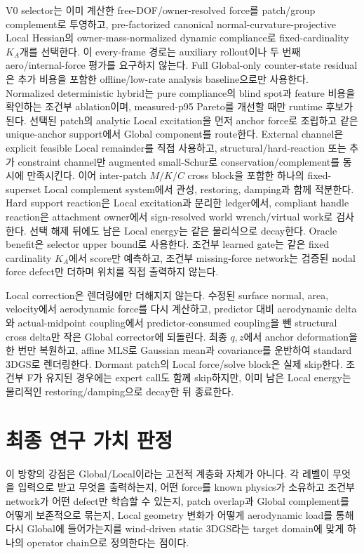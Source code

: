 \documentclass[11pt,a4paper]{article}
\begin{document}
V0 selector는 이미 계산한 free-DOF/owner-resolved force를 patch/group complement로 투영하고,
pre-factorized canonical normal-curvature-projective Local Hessian의 owner-mass-normalized dynamic compliance로
fixed-cardinality \(K_A\)개를 선택한다. 이 every-frame 경로는 auxiliary rollout이나 두 번째
aero/internal-force 평가를 요구하지 않는다. Full Global-only counter-state residual은
추가 비용을 포함한 offline/low-rate analysis baseline으로만 사용한다.
Normalized deterministic hybrid는 pure compliance의 blind spot과 feature 비용을 확인하는
조건부 ablation이며, measured-p95 Pareto를 개선할 때만 runtime 후보가 된다.
선택된 patch의 analytic Local excitation을 먼저 anchor force로 조립하고
같은 unique-anchor support에서 Global component를 route한다. External channel은 explicit
feasible Local remainder를 직접 사용하고, structural/hard-reaction 또는 추가 constraint channel만
augmented small-Schur로 conservation/complement를 동시에 만족시킨다. 이어 inter-patch
\(M/K/C\) cross block을 포함한 하나의 fixed-superset
Local complement system에서 관성, restoring, damping과 함께 적분한다.
Hard support reaction은 Local excitation과 분리한 ledger에서, compliant handle reaction은
attachment owner에서 sign-resolved world wrench/virtual work로 검사한다.
선택 해제 뒤에도 남은 Local energy는 같은 물리식으로 decay한다.
Oracle benefit은 selector upper bound로 사용한다.
조건부 learned gate는 같은 fixed cardinality \(K_A\)에서 score만 예측하고,
조건부 missing-force network는 검증된 nodal force defect만 더하며 위치를 직접 출력하지 않는다.

Local correction은 렌더링에만 더해지지 않는다.
수정된 surface normal, area, velocity에서 aerodynamic force를 다시 계산하고,
predictor 대비 aerodynamic delta와
actual-midpoint coupling에서 predictor-consumed coupling을 뺀 structural cross delta만
작은 Global corrector에 되돌린다.
최종 \(q,z\)에서 anchor deformation을 한 번만 복원하고,
affine MLS로 Gaussian mean과 covariance를 운반하여 standard 3DGS로 렌더링한다.
Dormant patch의 Local force/solve block은 실제 skip한다.
조건부 F가 유지된 경우에는 expert call도 함께 skip하지만,
이미 남은 Local energy는 물리적인 restoring/damping으로 decay한 뒤 종료한다.

\section{최종 연구 가치 판정}

이 방향의 강점은 Global/Local이라는 고전적 계층화 자체가 아니다.
각 레벨이 무엇을 입력으로 받고 무엇을 출력하는지,
어떤 force를 known physics가 소유하고 조건부 network가 어떤 defect만 학습할 수 있는지,
patch overlap과 Global complement를 어떻게 보존적으로 묶는지,
Local geometry 변화가 어떻게 aerodynamic load를 통해 다시 Global에 들어가는지를
wind-driven static 3DGS라는 target domain에 맞게 하나의 operator chain으로 정의한다는 점이다.
\end{document}
